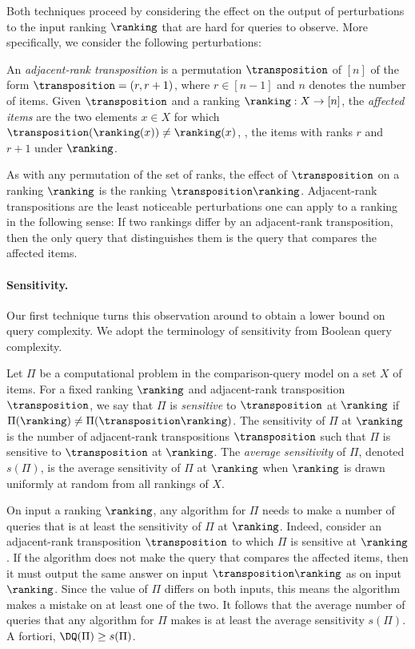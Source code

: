 Both techniques proceed by considering the effect on the output of perturbations to the input ranking $\ranking$ that are hard for queries to observe. More specifically, we consider the following perturbations:
\begin{definition}
An \emph{adjacent-rank transposition} is a permutation $\transposition$ of $[n]$ of the form $\transposition = (r,r+1)$, where $r \in [n-1]$ and $n$ denotes the number of items. Given $\transposition$ and a ranking $\ranking: X \to [n]$, the \emph{affected items} are the two elements $x \in X$ for which $\transposition(\ranking(x)) \ne \ranking(x)$, \ie, the items with ranks $r$ and $r+1$ under $\ranking$. 
\end{definition}
As with any permutation of the set of ranks, the effect of $\transposition$ on a ranking $\ranking$ is the ranking $\transposition \ranking$. 
Adjacent-rank transpositions are the least noticeable perturbations one can apply to a ranking in the following sense: If two rankings differ by an adjacent-rank transposition, then the only query that distinguishes them is the query that compares the affected items. 

\paragraph{Sensitivity.}
Our first technique turns this observation around to obtain a lower bound on query complexity. We adopt the terminology of sensitivity from Boolean query complexity. 

\begin{definition}\label{def:sensitivity}
Let $\Pi$ be a computational problem in the comparison-query model on a set $X$ of items. For a fixed ranking $\ranking$ and adjacent-rank transposition $\transposition$, we say that $\Pi$ is \emph{sensitive} to $\transposition$ at $\ranking$ if $\Pi(\ranking) \ne \Pi(\transposition \ranking)$. The sensitivity of $\Pi$ at $\ranking$ is the number of adjacent-rank transpositions $\transposition$ such that $\Pi$ is sensitive to $\transposition$ at $\ranking$. The \emph{average sensitivity} of $\Pi$, denoted $s(\Pi)$, is the average sensitivity of $\Pi$ at $\ranking$ when $\ranking$ is drawn uniformly at random from all rankings of $X$.
\end{definition}
On input a ranking $\ranking$, any algorithm for $\Pi$ needs to make a number of queries that is at least the sensitivity of $\Pi$ at $\ranking$. Indeed, consider an adjacent-rank transposition $\transposition$ to which $\Pi$ is sensitive at $\ranking$. If the algorithm does not make the query that compares the affected items, then it must output the same answer on input $\transposition \ranking$ as on input $\ranking$. Since the value of $\Pi$ differs on both inputs, this means the algorithm makes a mistake on at least one of the two. It follows that the average number of queries that any algorithm for $\Pi$ makes is at least the average sensitivity $s(\Pi)$. A fortiori, $\DQ(\Pi) \ge s(\Pi)$. 

